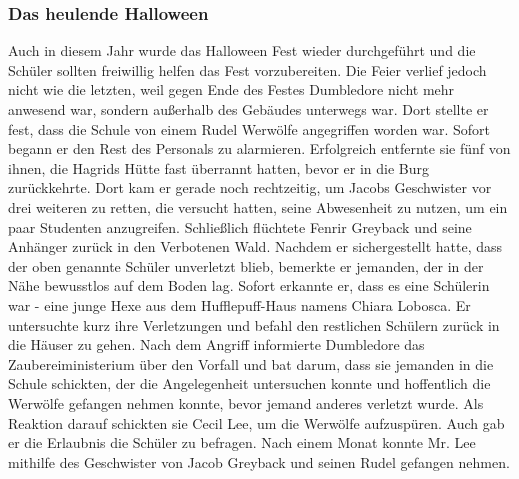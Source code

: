 \documentclass[a4paper, 10pt]{article}
\begin{document}
\subsubsection*{Das heulende Halloween}
Auch in diesem Jahr wurde das Halloween Fest wieder durchgeführt und die Schüler sollten freiwillig helfen das Fest vorzubereiten. Die Feier verlief jedoch nicht wie die letzten, weil gegen Ende des Festes Dumbledore nicht mehr anwesend war, sondern außerhalb des Gebäudes unterwegs war.
\vspace{10pt}
\newline
Dort stellte er fest, dass die Schule von einem Rudel Werwölfe angegriffen worden war. Sofort begann er den Rest des Personals zu alarmieren. Erfolgreich entfernte sie fünf von ihnen, die Hagrids Hütte fast überrannt hatten, bevor er in die Burg zurückkehrte. Dort kam er gerade noch rechtzeitig, um Jacobs Geschwister vor drei weiteren zu retten, die versucht hatten, seine Abwesenheit zu nutzen, um ein paar Studenten anzugreifen. Schließlich flüchtete Fenrir Greyback und seine Anhänger zurück in den Verbotenen Wald. Nachdem er sichergestellt hatte, dass der oben genannte Schüler unverletzt blieb, bemerkte er jemanden, der in der Nähe bewusstlos auf dem Boden lag. Sofort erkannte er, dass es eine Schülerin war - eine junge Hexe aus dem Hufflepuff-Haus namens Chiara Lobosca. Er untersuchte kurz ihre Verletzungen und befahl den restlichen Schülern zurück in die Häuser zu gehen. Nach dem Angriff informierte Dumbledore das Zaubereiministerium über den Vorfall und bat darum, dass sie jemanden in die Schule schickten, der die Angelegenheit untersuchen konnte und hoffentlich die Werwölfe gefangen nehmen konnte, bevor jemand anderes verletzt wurde. Als Reaktion darauf schickten sie Cecil Lee, um die Werwölfe aufzuspüren. Auch gab er die Erlaubnis die Schüler zu befragen. Nach einem Monat konnte Mr. Lee mithilfe des Geschwister von Jacob Greyback und seinen Rudel gefangen nehmen.
\end{document}
